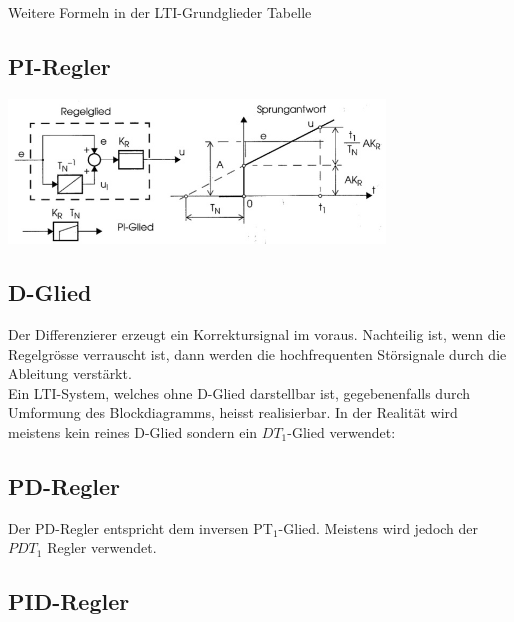 		Weitere Formeln in der LTI-Grundglieder Tabelle

	\subsection{PI-Regler }
		\includegraphics[width=10cm]{./images/PI_Regler.jpg} \\
		\qquad
		\qquad

	\subsection{D-Glied }
		Der Differenzierer erzeugt ein Korrektursignal im voraus.
		Nachteilig ist, wenn die Regelgrösse verrauscht ist, dann werden die
		hochfrequenten Störsignale durch die Ableitung verstärkt.\\
		Ein LTI-System, welches ohne D-Glied darstellbar ist, gegebenenfalls durch
		Umformung des Blockdiagramms, heisst realisierbar.  In der Realität wird
		meistens kein reines D-Glied sondern ein $DT_1$-Glied verwendet:\\

	\subsection{PD-Regler  }
		Der PD-Regler entspricht dem inversen PT$_1$-Glied. Meistens wird jedoch
		der $PDT_1$ Regler verwendet.\\

	\subsection{PID-Regler  }

